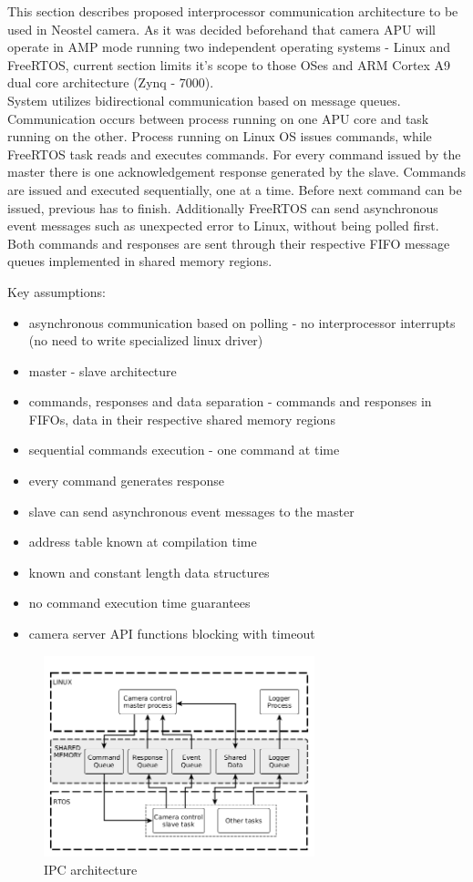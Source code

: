 This section describes proposed interprocessor communication architecture to be used in Neostel camera. As it was decided beforehand that camera APU will operate in AMP mode running two independent operating systems - Linux and FreeRTOS, current section limits it's scope to those OSes and ARM Cortex A9 dual core architecture (Zynq - 7000). \\
System utilizes bidirectional communication based on message queues. Communication occurs between process running on one APU core and task running on the other. Process running on Linux OS issues commands, while FreeRTOS task reads and executes commands. For every command issued by the master there is one acknowledgement response generated by the slave. Commands are issued and executed sequentially, one at a time. Before next command can be issued, previous has to finish. Additionally FreeRTOS can send asynchronous event messages such as unexpected error to Linux, without being polled first. Both commands and responses are sent through their respective FIFO message queues implemented in shared memory regions.

\vspace{\baselineskip}
Key assumptions:
\begin{itemize}
\item asynchronous communication based on polling - no interprocessor interrupts (no need to write specialized linux driver)
\item master - slave architecture
\item commands, responses and data separation - commands and responses in FIFOs, data in their respective shared memory regions
\item sequential commands execution - one command at time
\item every command generates response
\item slave can send asynchronous event messages to the master
\item address table known at compilation time
\item known and constant length data structures
\item no command execution time guarantees
\item camera server API functions blocking with timeout
\end{itemize}

\begin{figure}[H]
\centering
\includegraphics[width=0.7\textwidth]{pict/ipc.png}
\caption{IPC architecture}
\label{fig:ipc_arch}
\end{figure}


